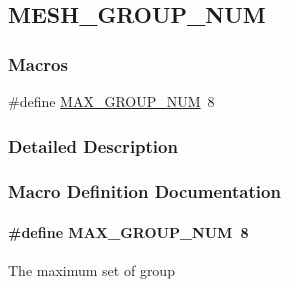 \hypertarget{group___m_e_s_h___g_r_o_u_p___n_u_m}{}\subsection{M\+E\+S\+H\+\_\+\+G\+R\+O\+U\+P\+\_\+\+N\+UM}
\label{group___m_e_s_h___g_r_o_u_p___n_u_m}
\subsubsection*{Macros}
\begin{DoxyCompactItemize}
\item 
\#define \hyperlink{group___m_e_s_h___g_r_o_u_p___n_u_m_ga4c4e392ad838b407e834d8fc117f797c}{M\+A\+X\+\_\+\+G\+R\+O\+U\+P\+\_\+\+N\+UM}~8
\end{DoxyCompactItemize}


\subsubsection{Detailed Description}


\subsubsection{Macro Definition Documentation}
\paragraph[{\texorpdfstring{M\+A\+X\+\_\+\+G\+R\+O\+U\+P\+\_\+\+N\+UM}{MAX_GROUP_NUM}}]{\setlength{\rightskip}{0pt plus 5cm}\#define M\+A\+X\+\_\+\+G\+R\+O\+U\+P\+\_\+\+N\+UM~8}\hypertarget{group___m_e_s_h___g_r_o_u_p___n_u_m_ga4c4e392ad838b407e834d8fc117f797c}{}\label{group___m_e_s_h___g_r_o_u_p___n_u_m_ga4c4e392ad838b407e834d8fc117f797c}
The maximum set of group 
